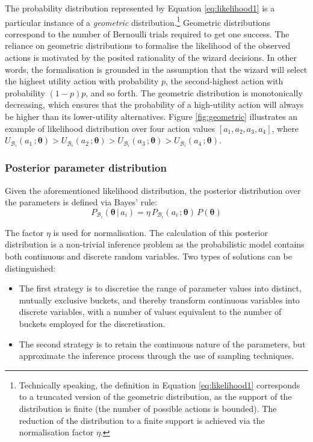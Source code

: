 The probability distribution represented by Equation \eqref{eq:likelihood1} is a particular instance of a \textit{geometric} distribution.\footnote{Technically speaking, the definition in Equation \eqref{eq:likelihood1} corresponds to a truncated version of the geometric distribution, as the support of the distribution is finite (the number of possible actions is bounded). The reduction of the distribution to a finite support is achieved via the normalisation factor $\eta$.} Geometric distributions correspond to the number of Bernoulli trials required to get one success. The reliance on geometric distributions to formalise the likelihood of the observed actions is motivated by the posited rationality of the wizard decisions.  In other words, the formalisation is grounded in the assumption that the wizard will select the highest utility action with probability $p$, the second-highest action with probability $(1-p)p$, and so forth. The geometric distribution is monotonically decreasing, which ensures that the probability of a high-utility action will always be higher than its lower-utility alternatives.   Figure \ref{fig:geometric} illustrates an example of likelihood distribution over four action values $[a_1, a_2, a_3, a_4]$, where $U_{\mathcal{B}_i}(a_1\,; \boldsymbol\theta) > U_{\mathcal{B}_i}(a_2\,; \boldsymbol\theta) > U_{\mathcal{B}_i}(a_3\,; \boldsymbol\theta) > U_{\mathcal{B}_i}(a_4\,; \boldsymbol\theta)$.


\subsubsection*{Posterior parameter distribution}

Given the aforementioned likelihood distribution, the posterior distribution over the parameters is defined via Bayes' rule: 
\begin{equation}
P_{\mathcal{B}_i}(\boldsymbol\theta \, | \, a_i) = \eta \, P_{\mathcal{B}_i}(a_i\,; \boldsymbol\theta) \, P(\boldsymbol\theta ) \label{eq:paramposterior}
\end{equation}

The factor $\eta$ is used for normalisation. The calculation of this posterior distribution is a non-trivial inference problem as the probabilistic model contains both continuous and discrete random variables.  Two types of solutions can be distinguished:
\begin{itemize}
\item The first strategy is to discretise the range of parameter values into distinct, mutually exclusive buckets, and thereby transform continuous variables into discrete variables, with a number of values equivalent to the number of buckets employed for the discretisation.
\item The second strategy is to retain the continuous nature of the parameters, but approximate the inference process through the use of sampling techniques.  
\end{itemize}

